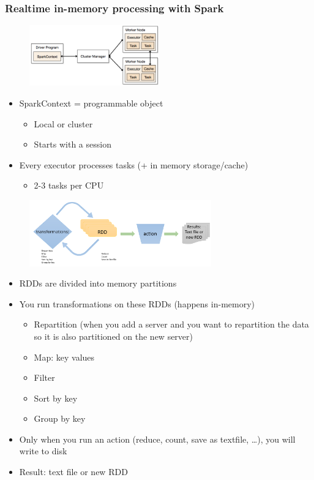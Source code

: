 \documentclass{article}
\begin{document}
\subsubsection{Realtime in-memory processing with Spark}

\begin{figure}[H]
    \centering
    \includegraphics[width=0.5\textwidth]{spark-realtime-inmemory-processing.png}
\end{figure}

\begin{itemize}
    \item SparkContext = programmable object
    \begin{itemize}
        \item Local or cluster
        \item Starts with a session
    \end{itemize}
    \item Every executor processes tasks (+ in memory storage/cache)
    \begin{itemize}
        \item 2-3 tasks per CPU
    \end{itemize}
\end{itemize}

\begin{figure}[H]
    \centering
    \includegraphics[width=0.7\textwidth]{rdd-schematic.png}
\end{figure}

\begin{itemize}
    \item RDDs are divided into memory partitions
    \item You run transformations on these RDDs (happens in-memory)
    \begin{itemize}
        \item Repartition (when you add a server and you want to repartition the data so it is also partitioned on the new server)
        \item Map: key values
        \item Filter
        \item Sort by key
        \item Group by key
    \end{itemize}
    \item Only when you run an action (reduce, count, save as textfile, \dots), you will write to disk
    \item Result: text file or new RDD
\end{itemize}
\end{document}
